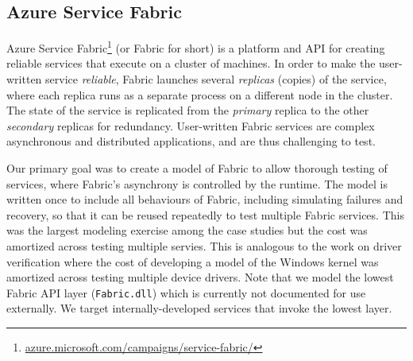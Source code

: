 \subsection{Azure Service Fabric}
\label{sec:cases:fabric}

Azure Service Fabric\footnote{\url{azure.microsoft.com/campaigns/service-fabric/}} (or Fabric for short) is a platform and API for creating reliable services that execute on a cluster of machines. 
In order to make the user-written service \emph{reliable}, Fabric launches several \emph{replicas} (copies) of the service, where each replica runs as a separate process on a different node in the cluster.
The state of the service is replicated from the \emph{primary} replica to the other \emph{secondary} replicas for redundancy.
User-written Fabric services are complex asynchronous and distributed applications, and are thus challenging to test.

Our primary goal was to create a \psharp{} model of Fabric to allow
thorough testing of services, where Fabric's asynchrony is controlled 
by the \psharp{} runtime.
The model is written once
to include all behaviours of Fabric, including simulating failures and recovery,
so that it can be reused repeatedly to test multiple Fabric services.
This was the largest modeling exercise among the case studies but the cost
was amortized across testing multiple servies. This is analogous to the work
on driver verification \cite{ball2011slam} where the cost of developing a model
of the Windows kernel was amortized across testing multiple device drivers.
Note that we model the lowest Fabric API layer (\texttt{Fabric.dll})
which is currently not documented for use externally.
We target internally-developed services that invoke the lowest layer. 

